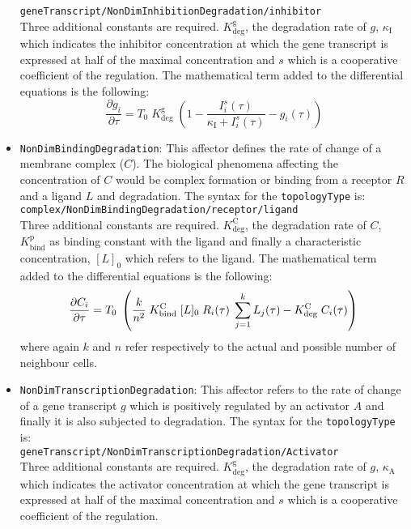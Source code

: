 \documentclass[a4paper, 11pt]{article}
\begin{document}
\begin{itemize}
  \texttt{geneTranscript/NonDimInhibitionDegradation/inhibitor}\\[1.5ex]
  Three additional constants are required.
  $K_{\mathrm{deg}}^{\mathrm{g}}$, the degradation rate of $g$, $\kappa_{\mathrm{I}}$ which indicates the inhibitor concentration at which the gene transcript is expressed at half of the maximal concentration and $s$ which is a cooperative coefficient of the regulation.
  The mathematical term added to the differential equations is the following:
  \begin{equation}
    \frac{\partial g_i}{\partial \tau} = T_0\;K_{\mathrm{deg}}^{\mathrm{g}}\;\left(1-\frac{I_{i}^{s}(\tau)}{\kappa_{\mathrm{I}}+I_{i}^{s}(\tau)}-g_{i}(\tau)\right)
  \end{equation}
\item \texttt{NonDimBindingDegradation}:
  This affector defines the rate of change of a membrane complex ($C$).
  The biological phenomena affecting the concentration of $C$ would be complex formation or binding from a receptor $R$ and a ligand $L$ and degradation.
  The syntax for the \texttt{topologyType} is:\\[1.5ex]
  \texttt{complex/NonDimBindingDegradation/receptor/ligand}\\[1.5ex]
  Three additional constants are required.
  $K_{\mathrm{deg}}^{\mathrm{C}}$, the degradation rate of $C$, $K_{\mathrm{bind}}^{\mathrm{p}}$ as binding constant with the ligand and finally a characteristic concentration, $[L]_0$ which refers to the ligand.
  The mathematical term added to the differential equations is the following:
  \begin{equation}
    \frac{\partial C_i}{\partial \tau} = T_0\;\left(\frac{k}{n^2}\;K_{\mathrm{bind}}^{\mathrm{C}}\;[L]_0\;R_{i}(\tau)\;\sum_{j=1}^{k}L_{j}(\tau)-K_{\mathrm{deg}}^{\mathrm{C}}\;C_{i}(\tau)\right)\\
  \end{equation}
  where again $k$ and $n$ refer respectively to the actual and possible number of neighbour cells.
\item \texttt{NonDimTranscriptionDegradation}:
  This affector refers to the rate of change of a gene transcript $g$ which is positively regulated by an activator $A$ and finally it is also subjected to degradation.
  The syntax for the \texttt{topologyType} is:\\[1.5ex]
  \texttt{geneTranscript/NonDimTranscriptionDegradation/Activator}\\[1.5ex]
  Three additional constants are required.
  $K_{\mathrm{deg}}^{\mathrm{g}}$, the degradation rate of $g$, $\kappa_{\mathrm{A}}$ which indicates the activator concentration at which the gene transcript is expressed at half of the maximal concentration and $s$ which is a cooperative coefficient of the regulation.

\end{itemize}
\end{document}

